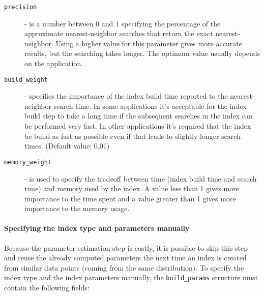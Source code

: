 \documentclass[letter,10pt]{article}
\begin{document}
\begin{description}

\item[\texttt{precision}] - is a number between 0 and 1 specifying the
percentage of the approximate nearest-neighbor searches that return the
exact nearest-neighbor. Using a higher value for this parameter gives
more
accurate results, but the searching takes longer. The optimum value
usually
depends on the application.

\item[\texttt{build\_weight}] - specifies the importance of the
index build time reported to the nearest-neighbor search time. In some
applications it's acceptable for the index build step to take a long time
if the subsequent searches in the index can be performed very fast. In
other applications it's required that the index be build as fast as
possible even if that leads to slightly longer search times. (Default
value: 0.01)

\item[\texttt{memory\_weight}] - is used to specify the tradeoff between
time (index build time and search time) and memory used by the index. A
value less than 1 gives more importance to the time spent and a value
greater than 1 gives more importance to the memory usage.
 \end{description}


\paragraph{Specifying the index type and parameters manually}

Because the parameter estimation step is costly, it is
possible to skip this step and reuse the already computed parameters the
next time an index is created from similar data points (coming from the
same distribution). To specify the index type and the index parameters
manually, the \texttt{build\_params} structure must contain the following
fields:
\end{document}
